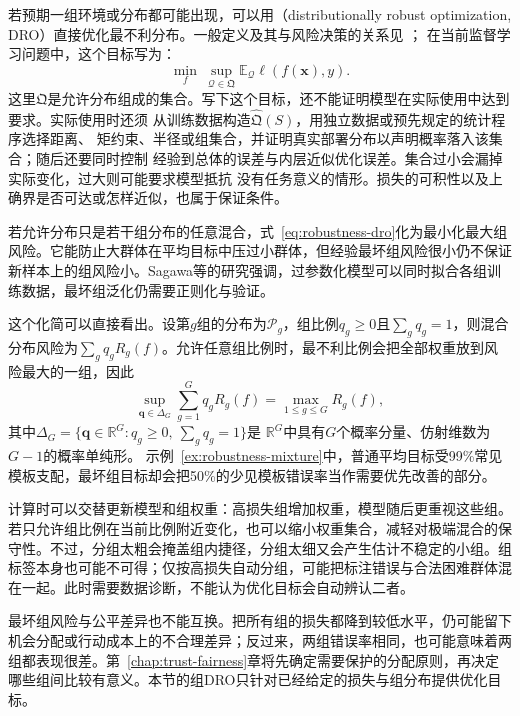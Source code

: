 若预期一组环境或分布都可能出现，可以用（distributionally robust optimization, DRO）直接优化最不利分布。一般定义及其与风险决策的关系见
；
在当前监督学习问题中，这个目标写为：
\begin{equation}
 \min_f\ \sup_{\mathcal Q\in\mathfrak Q}
   \mathbb E_{\mathcal Q}\ell(f(\bm{x}),y).
 \label{eq:robustness-dro}
\end{equation}
这里$\mathfrak Q$是允许分布组成的集合。写下这个目标，还不能证明模型在实际使用中达到要求。实际使用时还须
从训练数据构造$\widehat{\mathfrak Q}(S)$，用独立数据或预先规定的统计程序选择距离、
矩约束、半径或组集合，并证明真实部署分布以声明概率落入该集合；随后还要同时控制
经验到总体的误差与内层近似优化误差。集合过小会漏掉实际变化，过大则可能要求模型抵抗
没有任务意义的情形。损失的可积性以及上确界是否可达或怎样近似，也属于保证条件。

若允许分布只是若干组分布的任意混合，式~\eqref{eq:robustness-dro}化为最小化最大组风险。它能防止大群体在平均目标中压过小群体，但经验最坏组风险很小仍不保证新样本上的组风险小。Sagawa等的研究强调，过参数化模型可以同时拟合各组训练数据，最坏组泛化仍需要正则化与验证。

这个化简可以直接看出。设第$g$组的分布为$\mathcal P_g$，组比例$q_g\geq0$且$\sum_gq_g=1$，则混合分布风险为$\sum_gq_gR_g(f)$。允许任意组比例时，最不利比例会把全部权重放到风险最大的一组，因此
\begin{equation}
 \sup_{\bm{q}\in\Delta_G}\sum_{g=1}^{G}q_gR_g(f)
       =\max_{1\leq g\leq G}R_g(f),
 \label{eq:robustness-group-dro}
\end{equation}
其中$\Delta_G=\{\bm q\in\mathbb R^G:q_g\geq0,\ \sum_gq_g=1\}$是
$\mathbb R^G$中具有$G$个概率分量、仿射维数为$G-1$的概率单纯形。
示例~\ref{ex:robustness-mixture}中，普通平均目标受99\%常见模板支配，最坏组目标却会把50\%的少见模板错误率当作需要优先改善的部分。

计算时可以交替更新模型和组权重：高损失组增加权重，模型随后更重视这些组。若只允许组比例在当前比例附近变化，也可以缩小权重集合，减轻对极端混合的保守性。不过，分组太粗会掩盖组内捷径，分组太细又会产生估计不稳定的小组。组标签本身也可能不可得；仅按高损失自动分组，可能把标注错误与合法困难群体混在一起。此时需要数据诊断，不能认为优化目标会自动辨认二者。

最坏组风险与公平差异也不能互换。把所有组的损失都降到较低水平，仍可能留下机会分配或行动成本上的不合理差异；反过来，两组错误率相同，也可能意味着两组都表现很差。第~\ref{chap:trust-fairness}章将先确定需要保护的分配原则，再决定哪些组间比较有意义。本节的组DRO只针对已经给定的损失与组分布提供优化目标。

